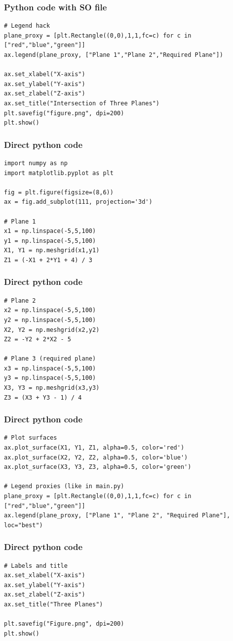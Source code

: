 \documentclass{beamer}
\begin{document}
\begin{frame}[fragile]
\frametitle{Python code with SO file}
\begin{lstlisting}
# Legend hack
plane_proxy = [plt.Rectangle((0,0),1,1,fc=c) for c in ["red","blue","green"]]
ax.legend(plane_proxy, ["Plane 1","Plane 2","Required Plane"])

ax.set_xlabel("X-axis")
ax.set_ylabel("Y-axis")
ax.set_zlabel("Z-axis")
ax.set_title("Intersection of Three Planes")
plt.savefig("figure.png", dpi=200)
plt.show()
\end{lstlisting}
\end{frame}
\begin{frame}[fragile]
\frametitle{Direct python code}
\begin{lstlisting}
import numpy as np
import matplotlib.pyplot as plt

fig = plt.figure(figsize=(8,6))
ax = fig.add_subplot(111, projection='3d')

# Plane 1
x1 = np.linspace(-5,5,100)
y1 = np.linspace(-5,5,100)
X1, Y1 = np.meshgrid(x1,y1)
Z1 = (-X1 + 2*Y1 + 4) / 3
\end{lstlisting}
\end{frame}
\begin{frame}[fragile]
\frametitle{Direct python code}
\begin{lstlisting}
# Plane 2
x2 = np.linspace(-5,5,100)
y2 = np.linspace(-5,5,100)
X2, Y2 = np.meshgrid(x2,y2)
Z2 = -Y2 + 2*X2 - 5

# Plane 3 (required plane)
x3 = np.linspace(-5,5,100)
y3 = np.linspace(-5,5,100)
X3, Y3 = np.meshgrid(x3,y3)
Z3 = (X3 + Y3 - 1) / 4
\end{lstlisting}
\end{frame}
\begin{frame}[fragile]
\frametitle{Direct python code}
\begin{lstlisting}
# Plot surfaces
ax.plot_surface(X1, Y1, Z1, alpha=0.5, color='red')
ax.plot_surface(X2, Y2, Z2, alpha=0.5, color='blue')
ax.plot_surface(X3, Y3, Z3, alpha=0.5, color='green')

# Legend proxies (like in main.py)
plane_proxy = [plt.Rectangle((0,0),1,1,fc=c) for c in ["red","blue","green"]]
ax.legend(plane_proxy, ["Plane 1", "Plane 2", "Required Plane"], loc="best")
\end{lstlisting}
\end{frame}
\begin{frame}[fragile]
\frametitle{Direct python code}
\begin{lstlisting}
# Labels and title
ax.set_xlabel("X-axis")
ax.set_ylabel("Y-axis")
ax.set_zlabel("Z-axis")
ax.set_title("Three Planes")

plt.savefig("Figure.png", dpi=200)
plt.show()


\end{lstlisting}
\end{frame}
\end{document}
